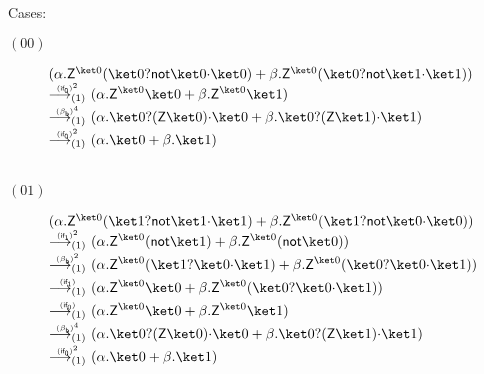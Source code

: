 \documentclass[preprint]{elsarticle}
\newcommand\lra[1][1]{\longrightarrow_{\left(#1\right)}}
\newcommand\ite[3]{{#1}?{#2}\mathord{\cdot}{#3}}
\newcommand\pair[2]{({#1}+{#2})}
\newcommand\s[1]{\ensuremath{\mathsf{#1}}}
\newcommand\red[2][1]{\overset{\scriptscriptstyle\smash{#2}\vphantom{x}}{\lra[#1]}\ }
\newcommand\rbetab{(\s{\beta_b})}
\newcommand\riftrue{(\s{if_{1}})}
\newcommand\riffalse{(\s{if_{0}})}
\begin{document}
Cases:
\begin{description}
\item[$(00)$] $\begin{aligned}[t] \omit\rlap{\parbox{\textwidth}{$ \pair
        {\alpha.\s Z^{\ket 0}(\ite{\ket 0}{\s{not}\ket 0}{\ket 0})} {\beta.\s
          Z^{\ket 0}(\ite{\ket 0}{\s{not}\ket 1}{\ket 1})}
        $}}\\
    \red{\riffalse^2} & \pair {\alpha.\s Z^{\ket 0}\ket 0} {\beta.\s Z^{\ket
        0}\ket 1}
    \\
    \red{\rbetab^4} & \pair {\alpha.\ite{\ket 0}{(\s Z\ket 0)}{\ket 0}}
    {\beta.\ite{\ket 0}{(\s Z\ket 1)}{\ket 1}}
    \\
    \red{\riffalse^2} & \pair {\alpha.\ket 0} {\beta.\ket 1}
    \\[5mm]
  \end{aligned}$

\item[$(01)$] $\begin{aligned}[t] \omit\rlap{\parbox{\textwidth}{$ \pair
        {\alpha.\s Z^{\ket 0}(\ite{\ket 1}{\s{not}\ket 1}{\ket 1})} {\beta.\s
          Z^{\ket 0}(\ite{\ket 1}{\s{not}\ket 0}{\ket 0})}
        $}}\\
    \red{\riftrue^2} & \pair {\alpha.\s Z^{\ket 0}(\s{not} \ket 1)} {\beta.\s
      Z^{\ket 0}(\s{not} \ket 0)}
    \\
    \red{\rbetab^2} & \pair {\alpha.\s Z^{\ket 0}(\ite{\ket 1}{\ket 0}{\ket 1})}
    {\beta.\s Z^{\ket 0}(\ite{\ket 0}{\ket 0}{\ket 1})}
    \\
    \red{\riftrue} & \pair {\alpha.\s Z^{\ket 0}\ket 0} {\beta.\s Z^{\ket
        0}(\ite{\ket 0}{\ket 0}{\ket 1})}
    \\
    \red{\riffalse} & \pair {\alpha.\s Z^{\ket 0}\ket 0} {\beta.\s Z^{\ket
        0}\ket 1}
    \\
    \red{\rbetab^4} & \pair {\alpha.\ite{\ket 0}{(\s Z\ket 0)}{\ket 0}}
    {\beta.\ite{\ket 0}{(\s Z\ket 1)}{\ket 1}}
    \\
    \red{\riffalse^2} & \pair {\alpha.\ket 0} {\beta.\ket 1}
  \end{aligned}$


\end{description}
\end{document}
